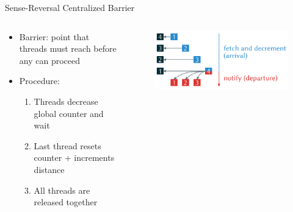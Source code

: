 \begin{frame}{Sense-Reversal Centralized Barrier}
  \begin{columns}[c] %
    \begin{column}{0.5\textwidth}
      \begin{itemize}
        \item Barrier: point that threads must reach before any can proceed
        \item Procedure:
        \begin{enumerate}
          \item Threads decrease global counter and wait
          \item Last thread resets counter + increments distance
          \item All threads are released together
        \end{enumerate}
      \end{itemize}
    \end{column}

    \begin{column}{0.5\textwidth}
      \begin{figure}
        \centering
        \includegraphics[width=\linewidth]{images/barrier.png}
      \end{figure}
    \end{column}
  \end{columns}
\end{frame}